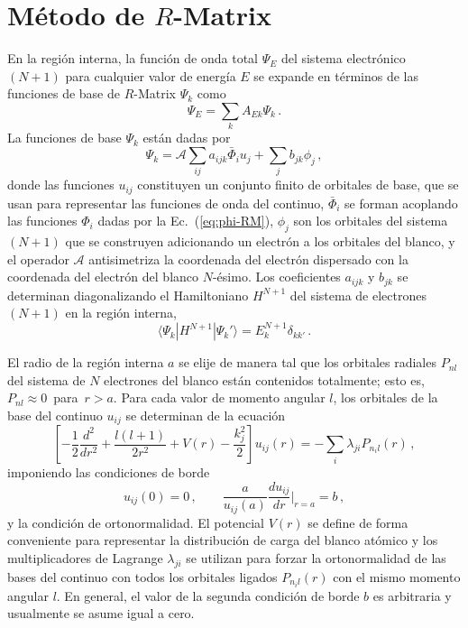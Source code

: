 \chapter{Método de $R$-Matrix}
\label{app:rmatrix}


En la región interna, la función de onda total $\Psi_E$ del sistema 
electrónico $(N+1)$ para cualquier valor de energía $E$ se expande en 
términos de las funciones de base de $R$-Matrix $\Psi_k$ como
\begin{equation}
\Psi_E=\sum_k A_{Ek}\Psi_k\,.
\label{eq:RM-wavefn}
\end{equation}
La funciones de base $\Psi_k$ están dadas por
\begin{equation}
\Psi_k=\mathcal{A}\sum_{ij}a_{ijk}\bar{\Phi}_i u_{j}
+\sum_j b_{jk}\phi_j\,,
\label{eq:RM-basisfn}
\end{equation}
donde las funciones $u_{ij}$ constituyen un conjunto finito de orbitales 
de base, que se usan para representar las funciones de onda del continuo,
$\bar{\Phi}_i$ se forman acoplando las funciones $\Phi_i$ dadas por la 
Ec.~(\ref{eq:phi-RM}), $\phi_j$ son los orbitales del sistema $(N+1)$ 
que se construyen adicionando un electrón a los orbitales del blanco, y 
el operador $\mathcal{A}$ 
antisimetriza la coordenada del electrón dispersado con la coordenada 
del electrón del blanco $N$-ésimo. Los coeficientes $a_{ijk}$ y $b_{jk}$ 
se determinan diagonalizando el Hamiltoniano $H^{N+1}$ del sistema de 
electrones $(N+1)$ en la región interna,
\begin{equation}
\langle\Psi_k\left|H^{N+1}\right|\Psi_k'\rangle=E_k^{N+1}\delta_{kk'}\,.
\label{eq:RM-N+1Hamilt}
\end{equation}

El radio de la región interna $a$ se elije de manera tal que los 
orbitales radiales $P_{nl}$ del sistema de $N$ electrones del blanco 
están contenidos totalmente; esto es, \mbox{$P_{nl}\approx 0$ para 
$r>a$.} Para 
cada valor de momento angular $l$, los orbitales de la base del continuo 
$u_{ij}$ se determinan de la ecuación
\begin{equation}
\left[-\frac{1}{2}\frac{d^2}{dr^2}+\frac{l(l+1)}{2r^2}+V(r)
-\frac{k_j^2}{2}\right]u_{ij}(r)=-\sum_i\lambda_{ji}P_{n_il}(r)\,,
\label{eq:RM-difeq-uj}
\end{equation}
imponiendo las condiciones de borde 
\begin{equation}
u_{ij}(0)=0\,,\qquad\frac{a}{u_{ij}(a)}\frac{du_{ij}}{dr}\bigg|_{r=a}=b\,,
\end{equation}
y la condición de ortonormalidad.
El potencial $V(r)$ se define de forma conveniente para representar la
distribución de carga del blanco atómico y los multiplicadores de 
Lagrange $\lambda_{ji}$ se utilizan para forzar la ortonormalidad de las
bases del continuo con todos los orbitales ligados $P_{n_il}(r)$ con el
mismo momento angular $l$. En general, el valor de la segunda condición 
de borde $b$ es arbitraria y usualmente se asume igual a cero.

